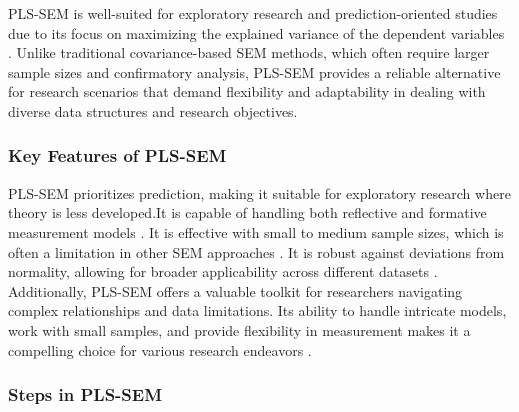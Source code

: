 PLS-SEM is well-suited for exploratory research and prediction-oriented studies due to its focus on maximizing the explained variance of the dependent variables \parencite{Henseler2015AModeling}. Unlike traditional covariance-based SEM methods, which often require larger sample sizes and confirmatory analysis, PLS-SEM provides a reliable alternative for research scenarios that demand flexibility and adaptability in dealing with diverse data structures and research objectives.

\subsubsection{Key Features of PLS-SEM}

PLS-SEM prioritizes prediction, making it suitable for exploratory research where theory is less developed.It is capable of handling both reflective and formative measurement models \parencite{Chin1998TheModeling}. It is effective with small to medium sample sizes, which is often a limitation in other SEM approaches \parencite{Sarstedt2017PartialModeling}. It is robust against deviations from normality, allowing for broader applicability across different datasets \parencite{Henseler2015AModeling}. Additionally, PLS-SEM offers a valuable toolkit for researchers navigating complex relationships and data limitations. Its ability to handle intricate models, work with small samples, and provide flexibility in measurement makes it a compelling choice for various research endeavors \parencite{Tenenhaus2005PLSModeling}.

\subsubsection{Steps in PLS-SEM}

